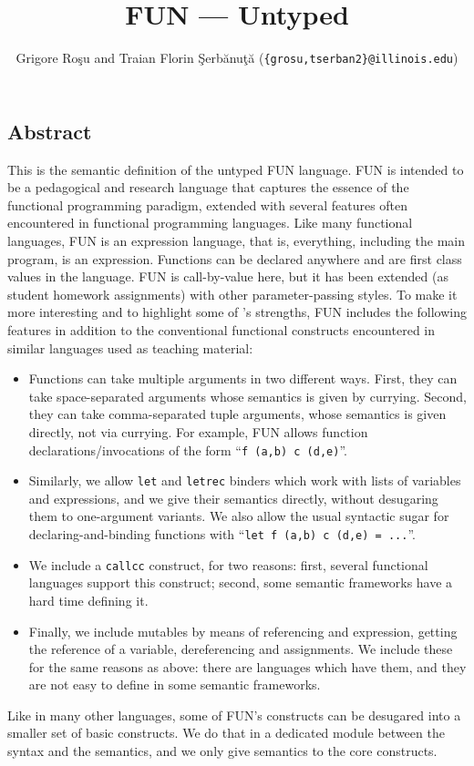 \setlength{\parindent}{1em}
\title{FUN --- Untyped}
\author{Grigore Ro\c{s}u and 
        Traian Florin \c{S}erb\u{a}nu\c{t}\u{a} (\texttt{\{grosu,tserban2\}@illinois.edu})}

\maketitle

\begin{latexComment}
\section{Abstract}
This is the \K semantic definition of the untyped FUN language.
FUN is intended to be a pedagogical and research language that captures
the essence of the functional programming paradigm, extended with several
features often encountered in functional programming languages.
Like many functional languages, FUN is an expression language,
that is, everything, including the main program, is an expression.
Functions can be declared anywhere and are first class values in the
language.  FUN is call-by-value here, but it has been extended (as
student homework assignments) with other parameter-passing styles.
To make it more interesting and to highlight some of \K's strengths,
FUN includes the following features in addition to the conventional
functional constructs encountered in similar languages used as
teaching material:
\begin{itemize}
\item Functions can take multiple arguments in two different ways.
First, they can take space-separated arguments whose semantics is given by
currying.  Second, they can take comma-separated tuple arguments, whose
semantics is given directly, not via currying.  For example, FUN allows
function declarations/invocations of the form
``\texttt{f (a,b) c  (d,e)}''.
\item Similarly, we allow \texttt{let} and \texttt{letrec} binders
which work with lists of variables and expressions, and we give
their semantics directly, without desugaring them to one-argument variants.
We also allow the usual syntactic sugar for declaring-and-binding functions
with ``\texttt{let f (a,b) c (d,e) = ...}''.
\item We include a \texttt{callcc} construct, for two reasons: first,
several functional languages support this construct; second, some
semantic frameworks have a hard time defining it.
\item Finally, we include mutables by means of referencing and
expression, getting the reference of a variable, dereferencing and
assignments.  We include these for the same reasons as above: there
are languages which have them, and they are not easy to define in some
semantic frameworks.
\end{itemize}
Like in many other languages, some of FUN's constructs can be
desugared into a smaller set of basic constructs.  We do that in a 
dedicated module between the syntax and the semantics, and we only
give semantics to the core constructs.


\end{latexComment}
